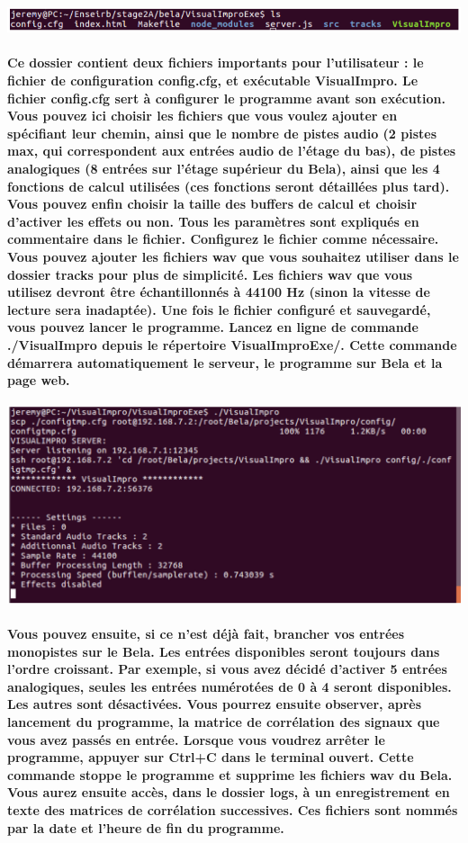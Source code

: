 \documentclass[a4paper]{article}
\begin{document}
\includegraphics[width=1\textwidth]{terminal1.png}

\paragraph{Ce dossier contient deux fichiers importants pour l’utilisateur : le
fichier de configuration config.cfg, et exécutable VisualImpro. Le fichier
config.cfg sert à configurer le programme avant son exécution. Vous pouvez ici
choisir les fichiers que vous voulez ajouter en spécifiant leur chemin, ainsi
que le nombre de pistes audio (2 pistes max, qui correspondent aux entrées audio
de l’étage du bas), de pistes analogiques (8 entrées sur l’étage supérieur du
Bela), ainsi que les 4 fonctions de calcul utilisées (ces fonctions seront
détaillées plus tard). Vous pouvez enfin choisir la taille des buffers de calcul
et choisir d’activer les effets ou non. Tous les paramètres sont expliqués en
commentaire dans le fichier. Configurez le fichier comme nécessaire. Vous pouvez
ajouter les fichiers wav que vous souhaitez utiliser dans le dossier tracks pour
plus de simplicité. Les fichiers wav que vous utilisez devront être
échantillonnés à 44100 Hz (sinon la vitesse de lecture sera inadaptée). Une fois
le fichier configuré et sauvegardé, vous pouvez lancer le programme. Lancez en
ligne de commande ./VisualImpro depuis le répertoire VisualImproExe/. Cette
commande démarrera automatiquement le serveur, le programme sur Bela et la page
web.}

\includegraphics[width=1\textwidth]{terminal2.png}

\paragraph{Vous pouvez ensuite, si ce n’est déjà fait, brancher vos entrées
monopistes sur le Bela. Les entrées disponibles seront toujours dans l’ordre
croissant. Par exemple, si vous avez décidé d’activer 5 entrées analogiques,
seules les entrées numérotées de 0 à 4 seront disponibles. Les autres sont
désactivées. Vous pourrez ensuite observer, après lancement du programme, la
matrice de corrélation des signaux que vous avez passés en entrée. Lorsque vous
voudrez arrêter le programme, appuyer sur Ctrl+C dans le terminal ouvert. Cette
commande stoppe le programme et supprime les fichiers wav du Bela. Vous aurez
ensuite accès, dans le dossier logs, à un enregistrement en texte des matrices
de corrélation successives. Ces fichiers sont nommés par la date et l’heure de
fin du programme.}
\end{document}
